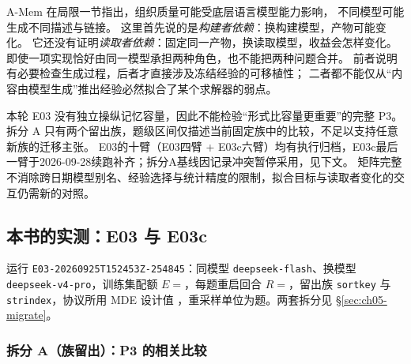 \begin{sloppypar}
A-Mem 在局限一节指出，组织质量可能受底层语言模型能力影响，
不同模型可能生成不同描述与链接\cite{amem-2502}。
这里首先说的是\emph{构建者依赖}：换构建模型，产物可能变化。
它还没有证明\emph{读取者依赖}：固定同一产物，换读取模型，收益会怎样变化。
即使一项实现恰好由同一模型承担两种角色，也不能把两种问题合并。
前者说明有必要检查生成过程，后者才直接涉及冻结经验的可移植性；
二者都不能仅从“内容由模型生成”推出经验必然拟合了某个求解器的弱点。
\end{sloppypar}

\begin{principlebox}
本轮 E03 没有独立操纵记忆容量，因此不能检验“形式比容量更重要”的完整 P3。
拆分 A 只有两个留出族，题级区间仅描述当前固定族中的比较，不足以支持任意新族的迁移主张。
E03的十臂（E03四臂 + E03c六臂）均有执行归档，E03c最后一臂于2026-09-28续跑补齐；拆分A基线因记录冲突暂停采用，见下文。
矩阵完整不消除跨日期模型别名、经验选择与统计精度的限制，拟合目标与读取者变化的交互仍需新的对照。
\end{principlebox}

\subsection{本书的实测：E03 与 E03c}
\label{sec:ch05-e03}

\begin{sloppypar}
运行 \texttt{E03-20260925T152453Z-254845}：同模型 \texttt{deepseek-flash}、换模型 \texttt{deepseek-v4-pro}，训练集配额 $E=$，每题重启回合 $R=$，留出族 \texttt{sortkey} 与 \texttt{strindex}，协议所用 MDE 设计值 ，重采样单位为题。两套拆分见 §\ref{sec:ch05-migrate}。
\end{sloppypar}

\subsubsection{拆分 A（族留出）：P3 的相关比较}


